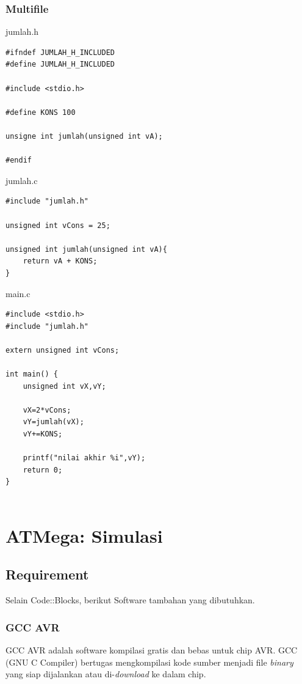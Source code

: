 \documentclass[12pt,]{article}
\begin{document}
	\subsubsection{Multifile}
	
	jumlah.h
	\begin{verbatim}
#ifndef JUMLAH_H_INCLUDED
#define JUMLAH_H_INCLUDED

#include <stdio.h>

#define KONS 100

unsigne int jumlah(unsigned int vA);

#endif
	\end{verbatim}
	
	jumlah.c
	\begin{verbatim}
#include "jumlah.h"

unsigned int vCons = 25;

unsigned int jumlah(unsigned int vA){
	return vA + KONS;
}
	\end{verbatim}
	
	\newpage	
	main.c
	\begin{verbatim}
#include <stdio.h>
#include "jumlah.h"

extern unsigned int vCons;

int main() {
	unsigned int vX,vY;
	
	vX=2*vCons;
	vY=jumlah(vX);
	vY+=KONS;
	
	printf("nilai akhir %i",vY);
	return 0;
}
	
	\end{verbatim}

	\newpage	
	\section{ATMega: Simulasi}
	
	\subsection{Requirement}
	
	Selain Code::Blocks, berikut Software tambahan yang dibutuhkan.
	
	\subsubsection{GCC AVR}
	GCC AVR adalah software kompilasi gratis dan bebas untuk chip AVR.
	GCC (GNU C Compiler) bertugas mengkompilasi kode sumber menjadi file \textit{binary} yang siap dijalankan atau di-\textit{download} ke dalam chip.
	
\end{document}
